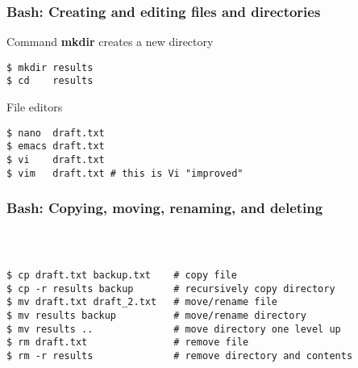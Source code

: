\begin{frame}[fragile]
  \frametitle{Bash: Creating and editing files and directories}
  \begin{exampleblock}{Command \alert{\textbf{mkdir}} creates a new directory}
    \begin{verbatim}
$ mkdir results
$ cd 	results
    \end{verbatim}
  \end{exampleblock}

   \begin{exampleblock}{File editors}
    \begin{verbatim}
$ nano 	draft.txt
$ emacs draft.txt
$ vi    draft.txt
$ vim   draft.txt # this is Vi "improved"
    \end{verbatim}
  \end{exampleblock}
\end{frame}

\begin{frame}[fragile]
  \frametitle{Bash: Copying, moving, renaming, and deleting}
\begin{columns}[t]
  \begin{exampleblock}{~}
    \begin{verbatim}
$ cp draft.txt backup.txt
$ cp -r results backup
$ mv draft.txt draft_2.txt
$ mv results backup
$ mv results ..
$ rm draft.txt
$ rm -r results
    \end{verbatim}
  \end{exampleblock}

  \begin{exampleblock}{~}
    \begin{verbatim}
# copy file
# recursively copy directory
# move/rename file
# move/rename directory
# move directory one level up
# remove file
# remove directory and contents
    \end{verbatim}
  \end{exampleblock}
\end{columns}
\end{frame}

